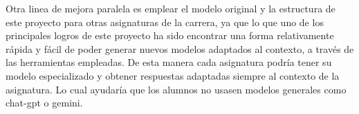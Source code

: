  Otra linea de mejora paralela es emplear el modelo original y la estructura de este proyecto para otras asignaturas de la carrera, ya que lo que uno de los principales logros de este proyecto ha sido encontrar una forma relativamente rápida y fácil de poder generar nuevos modelos adaptados al contexto, a través de las herramientas empleadas. De esta manera cada asignatura podría tener su modelo especializado y obtener respuestas adaptadas siempre al contexto de la asignatura. Lo cual ayudaría que los alumnos no usasen modelos generales como chat-gpt o gemini.
 
